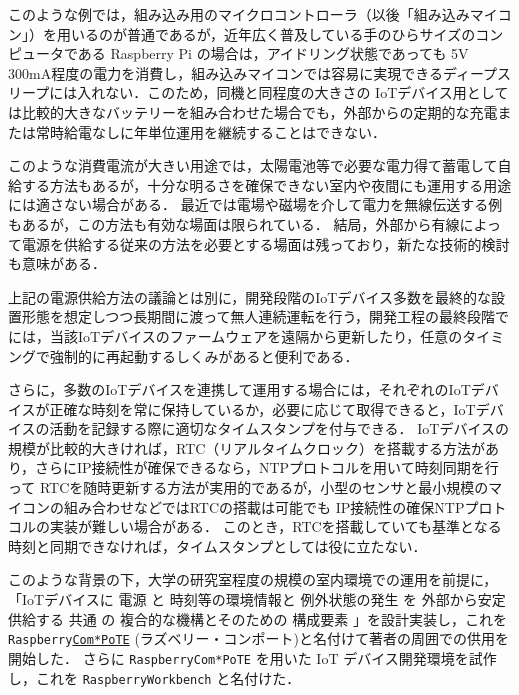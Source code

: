 このような例では，組み込み用のマイクロコントローラ（以後「組み込みマイコン」）を用いるのが普通であるが，近年広く普及している手のひらサイズのコンピュータである Raspberry Pi の場合は，アイドリング状態であっても 5V 300mA程度の電力を消費し，組み込みマイコンでは容易に実現できるディープスリープには入れない．このため，同機と同程度の大きさの IoTデバイス用としては比較的大きなバッテリーを組み合わせた場合でも，外部からの定期的な充電または常時給電なしに年単位運用を継続することはできない．

このような消費電流が大きい用途では，太陽電池等で必要な電力得て蓄電して自給する方法もあるが，十分な明るさを確保できない室内や夜間にも運用する用途には適さない場合がある．
最近では電場や磁場を介して電力を無線伝送する例もあるが，この方法も有効な場面は限られている．
結局，外部から有線によって電源を供給する従来の方法を必要とする場面は残っており，新たな技術的検討も意味がある．

上記の電源供給方法の議論とは別に，開発段階のIoTデバイス多数を最終的な設置形態を想定しつつ長期間に渡って無人連続運転を行う，開発工程の最終段階でには，当該IoTデバイスのファームウェアを遠隔から更新したり，任意のタイミングで強制的に再起動するしくみがあると便利である．

さらに，多数のIoTデバイスを連携して運用する場合には，それぞれのIoTデバイスが正確な時刻を常に保持しているか，必要に応じて取得できると，IoTデバイスの活動を記録する際に適切なタイムスタンプを付与できる．
IoTデバイスの規模が比較的大きければ，RTC（リアルタイムクロック）を搭載する方法があり，さらにIP接続性が確保できるなら，NTPプロトコルを用いて時刻同期を行って
RTCを随時更新する方法が実用的であるが，小型のセンサと最小規模のマイコンの組み合わせなどではRTCの搭載は可能でも IP接続性の確保NTPプロトコルの実装が難しい場合がある．
このとき，RTCを搭載していても基準となる時刻と同期できなければ，タイムスタンプとしては役に立たない．

このような背景の下，大学の研究室程度の規模の室内環境での運用を前提に，
「IoTデバイスに
電源 と
時刻等の環境情報と
例外状態の発生 を
外部から安定供給する
共通 の
複合的な機構とそのための
構成要素
」を設計実装し，これを
{\tt Raspberry\underline{Com*PoTE}}
(ラズベリー・コンポート)と名付けて著者の周囲での供用を開始した．
さらに {\tt Raspberry\-Com*PoTE} を用いた IoT デバイス開発環境を試作し，これを
{\tt RaspberryWorkbench}
と名付けた．

